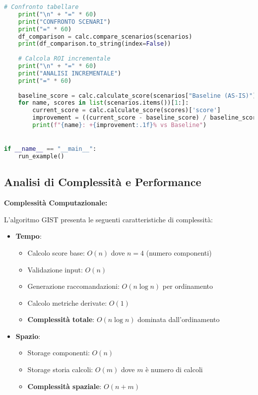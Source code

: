 \begin{lstlisting}[language=Python, caption={Implementazione completa GIST Calculator con validazione e reporting}]
    # Confronto tabellare
    print("\n" + "=" * 60)
    print("CONFRONTO SCENARI")
    print("=" * 60)
    df_comparison = calc.compare_scenarios(scenarios)
    print(df_comparison.to_string(index=False))
    
    # Calcola ROI incrementale
    print("\n" + "=" * 60)
    print("ANALISI INCREMENTALE")
    print("=" * 60)
    
    baseline_score = calc.calculate_score(scenarios["Baseline (AS-IS)"])['score']
    for name, scores in list(scenarios.items())[1:]:
        current_score = calc.calculate_score(scores)['score']
        improvement = ((current_score - baseline_score) / baseline_score) * 100
        print(f"{name}: +{improvement:.1f}% vs Baseline")


if __name__ == "__main__":
    run_example()
\end{lstlisting}

\subsection{\texorpdfstring{Analisi di Complessità e Performance}{C.4.3 - Analisi di Complessità e Performance}}

\textbf{Complessità Computazionale:}

L'algoritmo GIST presenta le seguenti caratteristiche di complessità:

\begin{itemize}
\item \textbf{Tempo}:
  \begin{itemize}
  \item Calcolo score base: $O(n)$ dove $n = 4$ (numero componenti)
  \item Validazione input: $O(n)$
  \item Generazione raccomandazioni: $O(n \log n)$ per ordinamento
  \item Calcolo metriche derivate: $O(1)$
  \item \textbf{Complessità totale}: $O(n \log n)$ dominata dall'ordinamento
  \end{itemize}
  
\item \textbf{Spazio}:
  \begin{itemize}
  \item Storage componenti: $O(n)$
  \item Storage storia calcoli: $O(m)$ dove $m$ è numero di calcoli
  \item \textbf{Complessità spaziale}: $O(n + m)$
  \end{itemize}
\end{itemize}


